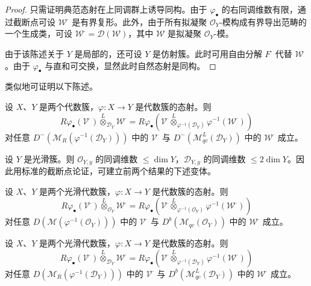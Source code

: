 \begin{proof}
只需证明典范态射在上同调群上诱导同构。由于 $\varphi_\bullet$ 的右同调维数有限，通过截断点可设 $\mathcal{W}^\cdot$ 是有界复形。此外，由于所有拟凝聚 $\mathcal{O}_Y$-模构成有界导出范畴的一个生成类，可设 $\mathcal{W}^\cdot=\mathcal{D}(\mathcal{W})$，其中 $\mathcal{W}$ 是拟凝聚 $\mathcal{O}_Y$-模。

由于该陈述关于 $Y$ 是局部的，还可设 $Y$ 是仿射簇。此时可用自由分解 $F^\cdot$ 代替 $\mathcal{W}$。由于 $\varphi_\bullet$ 与直和可交换，显然此时自然态射是同构。
\end{proof}

类似地可证明以下陈述。

\begin{proposition}\label{prop:4.4.2}
设 $X$、$Y$ 是两个代数簇，$\varphi:X\to Y$ 是代数簇的态射。则
$$R\varphi_\bullet(\mathcal{V}^\cdot)\overset{L}{\otimes}_{\mathcal{D}_Y}\mathcal{W}^\cdot
=R\varphi_\bullet(\mathcal{V}^\cdot\overset{L}{\otimes}_{\varphi^{-1}(\mathcal{D}_Y)}\varphi^{-1}(\mathcal{W}^\cdot))$$
对任意 $D^-(\mathcal{M}_R(\varphi^{-1}(\mathcal{D}_Y)))$ 中的 $\mathcal{V}^\cdot$ 与
$D^-(\mathcal{M}^L_{qc}(\mathcal{D}_Y))$ 中的 $\mathcal{W}^\cdot$ 成立。
\end{proposition}

设 $Y$ 是光滑簇。则 $\mathcal{O}_{Y,y}$ 的同调维数 $\le\dim Y$，$\mathcal{D}_{Y,y}$ 的同调维数 $\le 2\dim Y$。因此用标准的截断点论证，可建立前两个结果的下述变体。

\begin{proposition}\label{prop:4.4.3}
设 $X$、$Y$ 是两个光滑代数簇，$\varphi:X\to Y$ 是代数簇的态射。则
$$R\varphi_\bullet(\mathcal{V}^\cdot)\overset{L}{\otimes}_{\mathcal{O}_Y}\mathcal{W}^\cdot
=R\varphi_\bullet(\mathcal{V}^\cdot\overset{L}{\otimes}_{\varphi^{-1}(\mathcal{O}_Y)}\varphi^{-1}(\mathcal{W}^\cdot))$$
对任意 $D(\mathcal{M}(\varphi^{-1}(\mathcal{O}_Y)))$ 中的 $\mathcal{V}^\cdot$ 与
$D^b(\mathcal{M}_{qc}(\mathcal{O}_Y))$ 中的 $\mathcal{W}^\cdot$ 成立。
\end{proposition}

\begin{proposition}\label{prop:4.4.4}
设 $X$、$Y$ 是两个光滑代数簇，$\varphi:X\to Y$ 是代数簇的态射。则
$$R\varphi_\bullet(\mathcal{V}^\cdot)\overset{L}{\otimes}_{\mathcal{D}_Y}\mathcal{W}^\cdot
=R\varphi_\bullet(\mathcal{V}^\cdot\overset{L}{\otimes}_{\varphi^{-1}(\mathcal{D}_Y)}\varphi^{-1}(\mathcal{W}^\cdot))$$
对任意 $D(\mathcal{M}_R(\varphi^{-1}(\mathcal{D}_Y)))$ 中的 $\mathcal{V}^\cdot$ 与
$D^b(\mathcal{M}^L_{qc}(\mathcal{D}_Y))$ 中的 $\mathcal{W}^\cdot$ 成立。
\end{proposition}


